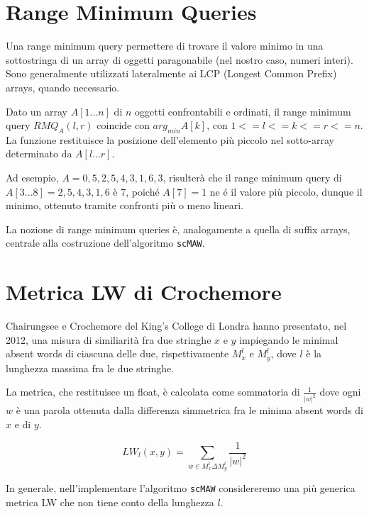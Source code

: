 \section{Range Minimum Queries}

Una range minimum query \cite{RMQ} permettere di trovare il valore minimo in una sottostringa di un array di oggetti paragonabile (nel nostro caso, numeri interi). Sono generalmente utilizzati lateralmente ai LCP (Longest Common Prefix) arrays, quando necessario.

\vspace{3mm}

Dato un array $A[1...n]$ di $n$ oggetti confrontabili e ordinati, il range minimum query $RMQ_A (l,r)$ coincide con $arg_{min} A[k]$, con $1<=l<=k<=r<=n$. La funzione restituisce la posizione dell'elemento più piccolo nel sotto-array determinato da $A[l...r]$. 

\vspace{3mm}

Ad esempio, $A=0,5,2,5,4,3,1,6,3$, risulterà che il range minimum query di $A[3...8]=2,5,4,3,1,6$ è 7, poiché $A[7]=1$ ne é il valore più piccolo, dunque il minimo, ottenuto tramite confronti più o meno lineari.

\vspace{3mm}

La nozione di range minimum queries è, analogamente a quella di suffix arrays, centrale alla costruzione dell'algoritmo \verb|scMAW|.

\section{Metrica LW di Crochemore}

Chairungsee e Crochemore del King's College di Londra hanno presentato, nel 2012, una misura di similiarità fra due stringhe $x$ e $y$ impiegando le minimal absent words \cite{CHAIRUNGSEE2012109} di ciascuna delle due, rispettivamente $M^l_x$ e $M^l_y$, dove $l$ è la lunghezza massima fra le due stringhe.

\vspace{3mm}

La metrica, che restituisce un float, è calcolata come sommatoria di $\frac{1}{|w|^2}$ dove ogni $w$ è una parola ottenuta dalla differenza simmetrica fra le minima absent words di $x$ e di $y$.

\[LW_l (x, y)=\sum_{w \in M^l_x \Delta M^l_y} \frac{1}{|w|^2 }\]

In generale, nell'implementare l'algoritmo \verb|scMAW| considereremo una più generica metrica LW che non tiene conto della lunghezza $l$.


